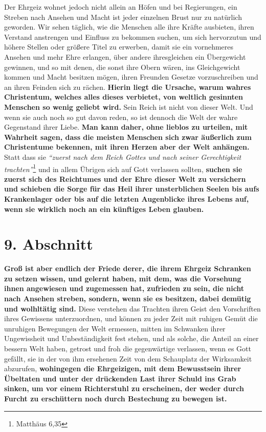 Der Ehrgeiz wohnet jedoch nicht allein an Höfen und bei Regierungen, ein Streben
nach Ansehen und Macht ist jeder einzelnen Brust nur zu natürlich geworden. Wir
sehen täglich, wie die Menschen alle ihre Kräfte ausbieten, ihren Verstand
anstrengen und Einfluss zu bekommen suchen, um sich hervorzutun und höhere
Stellen oder größere Titel zu erwerben, damit sie ein vornehmeres Ansehen und
mehr Ehre erlangen, über andere ihresgleichen ein Übergewicht gewinnen, und so
mit denen, die sonst ihre Obern wären, ins Gleichgewicht kommen und Macht
besitzen mögen, ihren Freunden Gesetze vorzuschreiben und an ihren Feinden sich
zu rächen.
\label{ref:08_08_reich_gottes} \textbf{Hierin liegt die Ursache, warum wahres
Christentum, welches alles
dieses verbietet, von weltlich gesinnten Menschen so wenig geliebt wird.} Sein
Reich ist nicht von dieser Welt.
Und wenn sie auch noch so gut davon reden, so
ist dennoch die Welt der wahre Gegenstand ihrer Liebe. \textbf{Man kann daher,
ohne
lieblos zu urteilen, mit Wahrheit sagen, dass die meisten Menschen sich zwar
äußerlich zum Christentume bekennen, mit ihren Herzen aber der
Welt anhängen.}
Statt dass sie
\textit{"`zuerst nach dem Reich Gottes und nach seiner Gerechtigkeit
trachten"'}\footnote{Matthäus 6,35}
und in allem Übrigen sich auf Gott verlassen
sollten, \textbf{suchen sie zuerst sich des Reichtumes und der Ehre dieser Welt
zu
versichern und schieben die Sorge für das Heil ihrer unsterblichen Seelen bis
aufs Krankenlager oder bis auf die letzten Augenblicke ihres Lebens auf, wenn
sie wirklich noch an ein künftiges Leben glauben.}

\section{9. Abschnitt} \label{kap8_ab9}

\label{ref:08_09_friedem} \textbf{Groß ist aber endlich der Friede derer,
die ihrem Ehrgeiz Schranken zu setzen wissen, und gelernt haben, mit dem, was
die Vorsehung ihnen angewiesen und
zugemessen hat, zufrieden zu sein,
die nicht nach Ansehen streben, sondern, wenn
sie es besitzen, dabei demütig und wolhltätig sind.} Diese verstehen das
Trachten ihren Geist den Vorschriften ihres Gewissens unterzuordnen, und
können zu jeder Zeit mit ruhigen Gemüt die unruhigen Bewegungen der Welt
ermessen, mitten im Schwanken ihrer Ungewissheit und Unbeständigkeit fest
stehen,
und als solche, die Anteil an einer bessern Welt haben, getrost und froh die
gegenwärtige verlassen, wenn es Gott gefällt, sie in der von ihm
ersehenen Zeit
von dem Schauplatz der Wirksamkeit abzurufen, \textbf{wohingegen die
Ehrgeizigen, mit
dem Bewusstsein ihrer Übeltaten und unter der drückenden Last ihrer
Schuld ins
Grab sinken, um vor einem Richterstuhl  zu erscheinen,
der weder durch Furcht zu
erschüttern noch durch Bestechung zu bewegen ist.}



